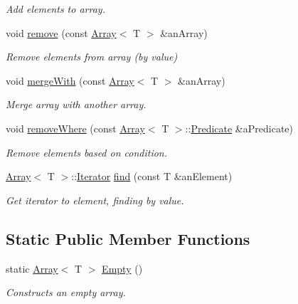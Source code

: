 \begin{DoxyCompactItemize}
\begin{DoxyCompactList}\small\item\em Add elements to array. \end{DoxyCompactList}\item 
void \mbox{\hyperlink{classlibrary_1_1core_1_1ctnr_1_1_array_ab37ca6fc14eefd1336544e05ba1b4d0e}{remove}} (const \mbox{\hyperlink{classlibrary_1_1core_1_1ctnr_1_1_array}{Array}}$<$ T $>$ \&an\+Array)
\begin{DoxyCompactList}\small\item\em Remove elements from array (by value) \end{DoxyCompactList}\item 
void \mbox{\hyperlink{classlibrary_1_1core_1_1ctnr_1_1_array_abe72cec38e65761df3eaddcfa9b7a44a}{merge\+With}} (const \mbox{\hyperlink{classlibrary_1_1core_1_1ctnr_1_1_array}{Array}}$<$ T $>$ \&an\+Array)
\begin{DoxyCompactList}\small\item\em Merge array with another array. \end{DoxyCompactList}\item 
void \mbox{\hyperlink{classlibrary_1_1core_1_1ctnr_1_1_array_a322b1bfc3a93ea18bf68eb0cff69e6d3}{remove\+Where}} (const \mbox{\hyperlink{classlibrary_1_1core_1_1ctnr_1_1_array}{Array}}$<$ T $>$\+::\mbox{\hyperlink{classlibrary_1_1core_1_1ctnr_1_1_array_a74cd325a740870aea490b6b739aa06ae}{Predicate}} \&a\+Predicate)
\begin{DoxyCompactList}\small\item\em Remove elements based on condition. \end{DoxyCompactList}\item 
\mbox{\hyperlink{classlibrary_1_1core_1_1ctnr_1_1_array}{Array}}$<$ T $>$\+::\mbox{\hyperlink{classlibrary_1_1core_1_1ctnr_1_1_array_a2364a34e7bc76d3661c3d89c4729a0e4}{Iterator}} \mbox{\hyperlink{classlibrary_1_1core_1_1ctnr_1_1_array_afece85f642e3c623bac197e25ad2d4ec}{find}} (const T \&an\+Element)
\begin{DoxyCompactList}\small\item\em Get iterator to element, finding by value. \end{DoxyCompactList}\end{DoxyCompactItemize}
\subsection*{Static Public Member Functions}
\begin{DoxyCompactItemize}
\item 
static \mbox{\hyperlink{classlibrary_1_1core_1_1ctnr_1_1_array}{Array}}$<$ T $>$ \mbox{\hyperlink{classlibrary_1_1core_1_1ctnr_1_1_array_a7795ee997ae6008cd0bc8db607315524}{Empty}} ()
\begin{DoxyCompactList}\small\item\em Constructs an empty array. \end{DoxyCompactList}\end{DoxyCompactItemize}
